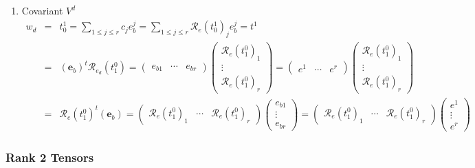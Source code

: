 \documentclass[aps,preprint]{revtex4}
\begin{document}
\begin{enumerate}
\item Covariant $V^{d}$ \label{Covariant V^d} 
\begin{eqnarray}
w_{d} &=&t_{0}^{1}=\sum_{1\leq j\leq r}c_{j}e_{b}^{j}=\sum_{1\leq j\leq r}%
\mathcal{R}_{e}\left( t_{0}^{1}\right) _{j}e_{b}^{j}=t^{1} \\
&=&\left( \boldsymbol{e}_{b}\right) ^{t}\mathcal{R}_{e_{d}}\left(
t_{1}^{0}\right) =\left( 
\begin{array}{ccc}
e_{b1} & \cdots & e_{br}%
\end{array}%
\right) \left( 
\begin{array}{c}
\mathcal{R}_{e}\left( t_{1}^{0}\right) _{1} \\ 
\vdots \\ 
\mathcal{R}_{e}\left( t_{1}^{0}\right) _{r}%
\end{array}%
\right) =\left( 
\begin{array}{ccc}
e^{1} & \cdots & e^{r}%
\end{array}%
\right) \left( 
\begin{array}{c}
\mathcal{R}_{e}\left( t_{1}^{0}\right) _{1} \\ 
\vdots \\ 
\mathcal{R}_{e}\left( t_{1}^{0}\right) _{r}%
\end{array}%
\right) \\
&=&\mathcal{R}_{e}\left( t_{1}^{0}\right) ^{t}\left( \boldsymbol{e}%
_{b}\right) =\left( 
\begin{array}{ccc}
\mathcal{R}_{e}\left( t_{1}^{0}\right) _{1} & \cdots & \mathcal{R}_{e}\left(
t_{1}^{0}\right) _{r}%
\end{array}%
\right) \left( 
\begin{array}{c}
e_{b1} \\ 
\vdots \\ 
e_{br}%
\end{array}%
\right) =\left( 
\begin{array}{ccc}
\mathcal{R}_{e}\left( t_{1}^{0}\right) _{1} & \cdots & \mathcal{R}_{e}\left(
t_{1}^{0}\right) _{r}%
\end{array}%
\right) \left( 
\begin{array}{c}
e^{1} \\ 
\vdots \\ 
e^{r}%
\end{array}%
\right)
\end{eqnarray}
\end{enumerate}

\subsubsection{Rank 2 Tensors}
\end{document}
